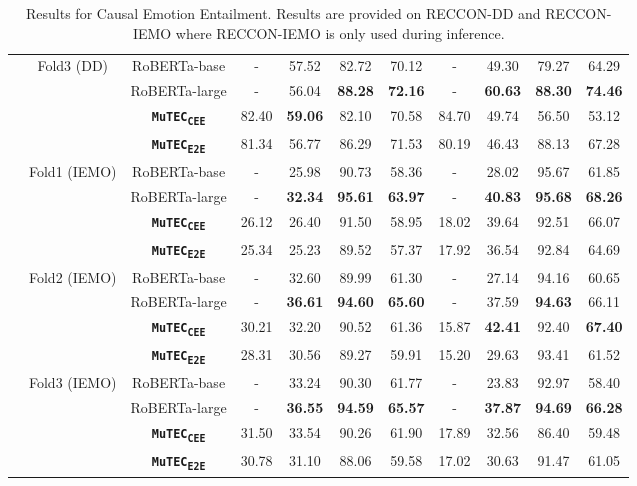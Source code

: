\documentclass{article}
\newcommand{\subtwo}{\textbf{\texttt{MuTEC\textsubscript{CEE}}}}
\newcommand{\overall}{\textbf{\texttt{MuTEC\textsubscript{E2E}}}}
\begin{document}
\begin{table*}[t]
{\begin{tabular}{|c|c|c|c|c|c|c|c|c|c|c|}
\\ \cline{2-11} 
 & \multirow{3}{*}{Fold3 (DD)}   & RoBERTa-base  & -     & 57.52 & 82.72 & 70.12 & -     & 49.30 & 79.27 & 64.29 \\ \cline{3-11} 
& & RoBERTa-large & -     & 56.04 & \textbf{88.28} & \textbf{72.16} & -     & \textbf{60.63} & \textbf{88.30} & \textbf{74.46} \\ \cline{3-11} 
& & \subtwo          & 82.40 & \textbf{59.06} & 82.10 & 70.58 & 84.70 & 49.74 & 56.50 & 53.12 
\\ \cline{3-11} 
&  & \overall          & 81.34 & 56.77 & 86.29 & 71.53 & 80.19 & 46.43 & 88.13 & 67.28

\\ \cline{2-11} 
 & \multirow{3}{*}{Fold1 (IEMO)} & RoBERTa-base  & -     & 25.98 & 90.73 & 58.36 & -     & 28.02 & 95.67 & 61.85 \\ \cline{3-11} 
  &  & RoBERTa-large & -     & \textbf{32.34} & \textbf{95.61} & \textbf{63.97} & -     & \textbf{40.83} & \textbf{95.68} & \textbf{68.26} \\ \cline{3-11} 
&  & \subtwo          & 26.12 & 26.40 & 91.50 & 58.95 & 18.02 & 39.64 & 92.51 & 66.07 
\\ \cline{3-11} 
&  & \overall          & 25.34 & 25.23 & 89.52 & 57.37 & 17.92 & 36.54 & 92.84 & 64.69

\\ \cline{2-11} 
& \multirow{3}{*}{Fold2 (IEMO)} & RoBERTa-base  & -     & 32.60 & 89.99 & 61.30 & -     & 27.14 & 94.16 & 60.65 \\ \cline{3-11} 
  & & RoBERTa-large & -     & \textbf{36.61} & \textbf{94.60} & \textbf{65.60} & -     & 37.59 & \textbf{94.63} & 66.11 \\ \cline{3-11} 
 &  & \subtwo   & 30.21 & 32.20 & 90.52 & 61.36 & 15.87 & \textbf{42.41} & 92.40 & \textbf{67.40} 
 \\ \cline{3-11} 
&  & \overall          & 28.31 & 30.56 & 89.27 & 59.91 & 15.20 & 29.63 & 93.41 & 61.52
\\ \cline{2-11} 
    & \multirow{3}{*}{Fold3 (IEMO)} & RoBERTa-base  & -     & 33.24 & 90.30 & 61.77 & -     & 23.83 & 92.97 & 58.40 \\ \cline{3-11}  &                               & RoBERTa-large & -     & \textbf{36.55} & \textbf{94.59} & \textbf{65.57} & -     & \textbf{37.87} & \textbf{94.69} & \textbf{66.28} \\ \cline{3-11} 
   &   & \subtwo & 31.50 & 33.54 & 90.26 & 61.90 & 17.89 & 32.56 & 86.40 & 59.48 
   \\ \cline{3-11} 
&  & \overall          & 30.78 & 31.10 & 88.06 & 59.58 & 17.02 & 30.63 & 91.47 & 61.05
   \\ \hline

\end{tabular}
}
\vspace{0.5mm}
\caption{Results for Causal Emotion Entailment. Results are provided on RECCON-DD and RECCON-IEMO where RECCON-IEMO is only used during inference.}
\label{tab:sub2}
\vspace{-5mm}
\end{table*}
\end{document}
